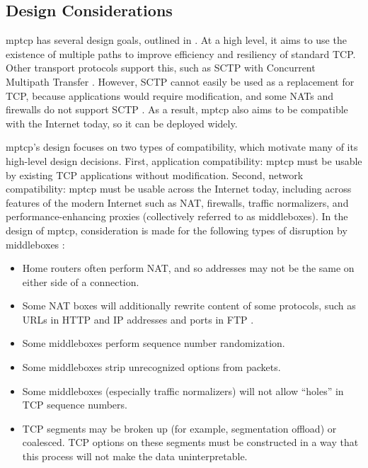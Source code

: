 \documentclass{cwru}
\begin{document}
\subsection{Design Considerations}

\ac{mptcp} has several design goals, outlined in \cite{rfc6182}. At a high
level, it aims to use the existence of multiple paths to improve efficiency and
resiliency of standard TCP. Other transport protocols support this, such as SCTP
with Concurrent Multipath Transfer \cite{iyengar2006concurrent}. However, SCTP
cannot easily be used as a replacement for TCP, because applications would
require modification, and some NATs and firewalls do not support SCTP
\cite{barre2011multipath}. As a result, \ac{mptcp} also aims to be compatible
with the Internet today, so it can be deployed widely.

\ac{mptcp}'s design focuses on two types of compatibility, which motivate many
of its high-level design decisions. First, application compatibility: \ac{mptcp}
must be usable by existing TCP applications without modification. Second,
network compatibility: \ac{mptcp} must be usable across the Internet today,
including across features of the modern Internet such as NAT, firewalls, traffic
normalizers, and performance-enhancing proxies (collectively referred to as
middleboxes). In the design of \ac{mptcp}, consideration is made for the
following types of disruption by middleboxes \cite{rfc6182}:

\begin{itemize}
\item Home routers often perform NAT, and so addresses may not be the same on
  either side of a connection.
\item Some NAT boxes will additionally rewrite content of some protocols, such
  as URLs in HTTP \cite{rfc6182} and IP addresses and ports in FTP
  \cite{raiciu2012hard}.
\item Some middleboxes perform sequence number randomization.
\item Some middleboxes strip unrecognized options from packets.
\item Some middleboxes (especially traffic normalizers) will not allow ``holes''
  in TCP sequence numbers.
\item TCP segments may be broken up (for example, segmentation offload) or
  coalesced. TCP options on these segments must be constructed in a way that
  this process will not make the data uninterpretable.
\end{itemize}
\end{document}
